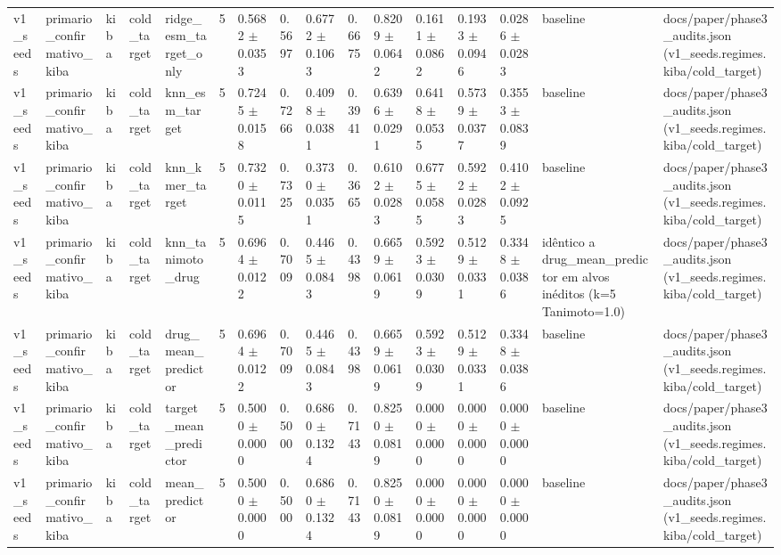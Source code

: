 \begin{table}[htbp]
\begin{tabular}{llllllllllllllll}
v1\_seeds & primario\_confirmativo\_kiba & kiba & cold\_target & ridge\_esm\_target\_only & 5 & 0.5682 $\pm$ 0.0353 & 0.5697 & 0.6772 $\pm$ 0.1063 & 0.6675 & 0.8209 $\pm$ 0.0642 & 0.1611 $\pm$ 0.0862 & 0.1933 $\pm$ 0.0946 & 0.0286 $\pm$ 0.0283 & baseline & docs/paper/phase3\_audits.json (v1\_seeds.regimes.kiba/cold\_target) \\
v1\_seeds & primario\_confirmativo\_kiba & kiba & cold\_target & knn\_esm\_target & 5 & 0.7245 $\pm$ 0.0158 & 0.7266 & 0.4098 $\pm$ 0.0381 & 0.3941 & 0.6396 $\pm$ 0.0291 & 0.6418 $\pm$ 0.0535 & 0.5739 $\pm$ 0.0377 & 0.3553 $\pm$ 0.0839 & baseline & docs/paper/phase3\_audits.json (v1\_seeds.regimes.kiba/cold\_target) \\
v1\_seeds & primario\_confirmativo\_kiba & kiba & cold\_target & knn\_kmer\_target & 5 & 0.7320 $\pm$ 0.0115 & 0.7325 & 0.3730 $\pm$ 0.0351 & 0.3665 & 0.6102 $\pm$ 0.0283 & 0.6775 $\pm$ 0.0585 & 0.5922 $\pm$ 0.0283 & 0.4102 $\pm$ 0.0925 & baseline & docs/paper/phase3\_audits.json (v1\_seeds.regimes.kiba/cold\_target) \\
v1\_seeds & primario\_confirmativo\_kiba & kiba & cold\_target & knn\_tanimoto\_drug & 5 & 0.6964 $\pm$ 0.0122 & 0.7009 & 0.4465 $\pm$ 0.0843 & 0.4398 & 0.6659 $\pm$ 0.0619 & 0.5923 $\pm$ 0.0309 & 0.5129 $\pm$ 0.0331 & 0.3348 $\pm$ 0.0386 & idêntico a drug\_mean\_predictor em alvos inéditos (k=5 Tanimoto=1.0) & docs/paper/phase3\_audits.json (v1\_seeds.regimes.kiba/cold\_target) \\
v1\_seeds & primario\_confirmativo\_kiba & kiba & cold\_target & drug\_mean\_predictor & 5 & 0.6964 $\pm$ 0.0122 & 0.7009 & 0.4465 $\pm$ 0.0843 & 0.4398 & 0.6659 $\pm$ 0.0619 & 0.5923 $\pm$ 0.0309 & 0.5129 $\pm$ 0.0331 & 0.3348 $\pm$ 0.0386 & baseline & docs/paper/phase3\_audits.json (v1\_seeds.regimes.kiba/cold\_target) \\
v1\_seeds & primario\_confirmativo\_kiba & kiba & cold\_target & target\_mean\_predictor & 5 & 0.5000 $\pm$ 0.0000 & 0.5000 & 0.6860 $\pm$ 0.1324 & 0.7143 & 0.8250 $\pm$ 0.0819 & 0.0000 $\pm$ 0.0000 & 0.0000 $\pm$ 0.0000 & 0.0000 $\pm$ 0.0000 & baseline & docs/paper/phase3\_audits.json (v1\_seeds.regimes.kiba/cold\_target) \\
v1\_seeds & primario\_confirmativo\_kiba & kiba & cold\_target & mean\_predictor & 5 & 0.5000 $\pm$ 0.0000 & 0.5000 & 0.6860 $\pm$ 0.1324 & 0.7143 & 0.8250 $\pm$ 0.0819 & 0.0000 $\pm$ 0.0000 & 0.0000 $\pm$ 0.0000 & 0.0000 $\pm$ 0.0000 & baseline & docs/paper/phase3\_audits.json (v1\_seeds.regimes.kiba/cold\_target) \\

\end{tabular}
\end{table}
